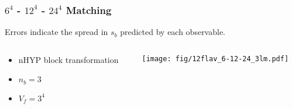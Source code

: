 \documentclass{beamer}
\begin{document}
  \begin{frame}
    \frametitle{$6^4$ - $12^4$ - $24^4$ Matching}
    \begin{center}
      Errors indicate the spread in $s_b$ predicted by each observable.
    \end{center}
    \begin{columns}[T]
      \begin{column}{.3\textwidth}
        \begin{block}{}
          \begin{itemize}
            \item nHYP block transformation
            \item $n_b=3$
            \item $V_f=3^4$
          \end{itemize}
        \end{block}
      \end{column}
      \begin{column}{.7\textwidth}
        \begin{block}{}
          \texttt{[image: fig/12flav\_6-12-24\_3lm.pdf]}
        \end{block}
      \end{column}
    \end{columns}
    \begin{center}
    \end{center}
  \end{frame}
\end{document}
